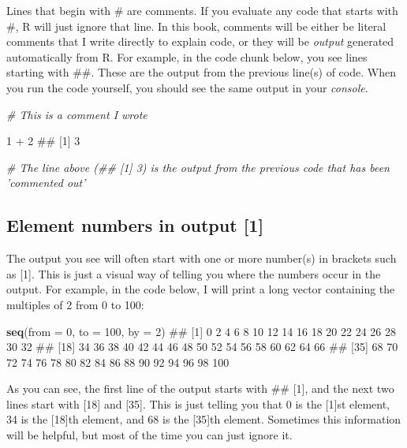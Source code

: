 \documentclass[]{book}
\newenvironment{Shaded}{\begin{snugshade}}{\end{snugshade}}
\newcommand{\KeywordTok}[1]{\textcolor[rgb]{0.13,0.29,0.53}{\textbf{{#1}}}}
\newcommand{\DataTypeTok}[1]{\textcolor[rgb]{0.13,0.29,0.53}{{#1}}}
\newcommand{\DecValTok}[1]{\textcolor[rgb]{0.00,0.00,0.81}{{#1}}}
\newcommand{\StringTok}[1]{\textcolor[rgb]{0.31,0.60,0.02}{{#1}}}
\newcommand{\CommentTok}[1]{\textcolor[rgb]{0.56,0.35,0.01}{\textit{{#1}}}}
\newcommand{\NormalTok}[1]{{#1}}
\theoremstyle{definition}
\theoremstyle{definition}
\theoremstyle{remark}
\begin{document}
Lines that begin with \# are comments. If you evaluate any code that
starts with \#, R will just ignore that line. In this book, comments
will be either be literal comments that I write directly to explain
code, or they will be \emph{output} generated automatically from R. For
example, in the code chunk below, you see lines starting with \#\#.
These are the output from the previous line(s) of code. When you run the
code yourself, you should see the same output in your \emph{console}.

\begin{Shaded}
\begin{Highlighting}[]
\CommentTok{# This is a comment I wrote}

\DecValTok{1} \NormalTok{+}\StringTok{ }\DecValTok{2}
\NormalTok{## [1] 3}

\CommentTok{# The line above (## [1] 3) is the output from the previous code that has been 'commented out'}
\end{Highlighting}
\end{Shaded}

\subsection{Element numbers in output
{[}1{]}}\label{element-numbers-in-output-1}

The output you see will often start with one or more number(s) in
brackets such as {[}1{]}. This is just a visual way of telling you where
the numbers occur in the output. For example, in the code below, I will
print a long vector containing the multiples of 2 from 0 to 100:

\begin{Shaded}
\begin{Highlighting}[]
\KeywordTok{seq}\NormalTok{(}\DataTypeTok{from =} \DecValTok{0}\NormalTok{, }\DataTypeTok{to =} \DecValTok{100}\NormalTok{, }\DataTypeTok{by =} \DecValTok{2}\NormalTok{)}
\NormalTok{##  [1]   0   2   4   6   8  10  12  14  16  18  20  22  24  26  28  30  32}
\NormalTok{## [18]  34  36  38  40  42  44  46  48  50  52  54  56  58  60  62  64  66}
\NormalTok{## [35]  68  70  72  74  76  78  80  82  84  86  88  90  92  94  96  98 100}
\end{Highlighting}
\end{Shaded}

As you can see, the first line of the output starts with \#\# {[}1{]},
and the next two lines start with {[}18{]} and {[}35{]}. This is just
telling you that 0 is the {[}1{]}st element, 34 is the {[}18{]}th
element, and 68 is the {[}35{]}th element. Sometimes this information
will be helpful, but most of the time you can just ignore it.
\end{document}
